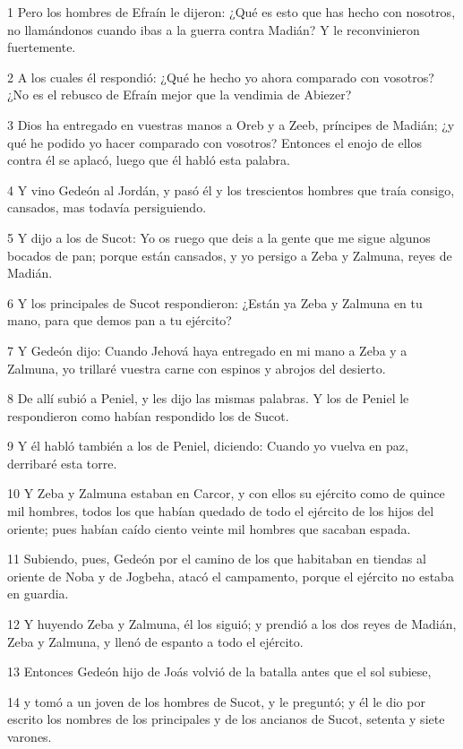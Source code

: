 \par 1 Pero los hombres de Efraín le dijeron: ¿Qué es esto que has hecho con nosotros, no llamándonos cuando ibas a la guerra contra Madián? Y le reconvinieron fuertemente.
\par 2 A los cuales él respondió: ¿Qué he hecho yo ahora comparado con vosotros? ¿No es el rebusco de Efraín mejor que la vendimia de Abiezer?
\par 3 Dios ha entregado en vuestras manos a Oreb y a Zeeb, príncipes de Madián; ¿y qué he podido yo hacer comparado con vosotros? Entonces el enojo de ellos contra él se aplacó, luego que él habló esta palabra.
\par 4 Y vino Gedeón al Jordán, y pasó él y los trescientos hombres que traía consigo, cansados, mas todavía persiguiendo.
\par 5 Y dijo a los de Sucot: Yo os ruego que deis a la gente que me sigue algunos bocados de pan; porque están cansados, y yo persigo a Zeba y Zalmuna, reyes de Madián.
\par 6 Y los principales de Sucot respondieron: ¿Están ya Zeba y Zalmuna en tu mano, para que demos pan a tu ejército?
\par 7 Y Gedeón dijo: Cuando Jehová haya entregado en mi mano a Zeba y a Zalmuna, yo trillaré vuestra carne con espinos y abrojos del desierto.
\par 8 De allí subió a Peniel, y les dijo las mismas palabras. Y los de Peniel le respondieron como habían respondido los de Sucot.
\par 9 Y él habló también a los de Peniel, diciendo: Cuando yo vuelva en paz, derribaré esta torre.
\par 10 Y Zeba y Zalmuna estaban en Carcor, y con ellos su ejército como de quince mil hombres, todos los que habían quedado de todo el ejército de los hijos del oriente; pues habían caído ciento veinte mil hombres que sacaban espada.
\par 11 Subiendo, pues, Gedeón por el camino de los que habitaban en tiendas al oriente de Noba y de Jogbeha, atacó el campamento, porque el ejército no estaba en guardia.
\par 12 Y huyendo Zeba y Zalmuna, él los siguió; y prendió a los dos reyes de Madián, Zeba y Zalmuna, y llenó de espanto a todo el ejército.
\par 13 Entonces Gedeón hijo de Joás volvió de la batalla antes que el sol subiese,
\par 14 y tomó a un joven de los hombres de Sucot, y le preguntó; y él le dio por escrito los nombres de los principales y de los ancianos de Sucot, setenta y siete varones.
